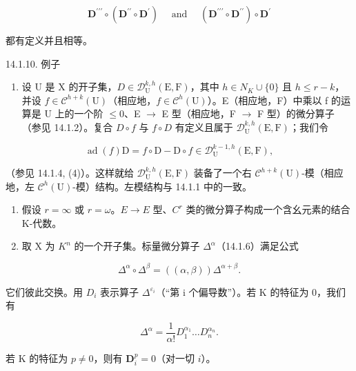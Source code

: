 \[
\mathbf {D} ^ {\prime \prime \prime} \circ (\mathbf {D} ^ {\prime \prime} \circ \mathbf {D} ^ {\prime}) \quad \text { and } \quad (\mathbf {D} ^ {\prime \prime \prime} \circ \mathbf {D} ^ {\prime \prime}) \circ \mathbf {D} ^ {\prime}
\]

都有定义并且相等。

14.1.10. 例子

\begin{enumerate}
\def\labelenumi{\alph{enumi})}
\tightlist
\item
  设 U 是 X 的开子集，\(D \in \mathcal{D}_{\mathrm{U}}^{k,h}(\mathrm{E}, \mathrm{F})\)，其中 \(h \in N_{K} \cup \{0\}\) 且 \(h \leqslant r-k\)，并设 \(f \in \mathcal{C}^{h+k}(\mathrm{U})\)（相应地，\(f \in \mathcal{C}^{h}(\mathrm{U})\)）。E（相应地，F）中乘以 f 的运算是 U 上的一个阶 \(\leqslant0\)、E \(\to\) E 型（相应地，F \(\to\) F 型）的微分算子（参见 14.1.2）。复合 \(D\circ f\) 与 \(f\circ D\) 有定义且属于 \(\mathcal{D}_{\mathrm{U}}^{k,h}(\mathrm{E},\mathrm{F})\)；我们令
\end{enumerate}

\[
\operatorname{ad} (f) \mathrm{D} = f \circ \mathrm{D} - \mathrm{D} \circ f \in \mathcal {D} _ {\mathrm{U}} ^ {k - 1, h} (\mathrm{E}, \mathrm{F}),
\]

（参见 14.1.4, (4)）。这样就给 \(\mathcal{D}_{\mathrm{U}}^{k,h}(\mathrm{E},\mathrm{F})\) 装备了一个右 \(\mathcal{C}^{h+k}(\mathrm{U})\)-模（相应地，左 \(\mathcal{C}^h (\mathrm{U})\)-模）结构。左模结构与 14.1.1 中的一致。

\begin{enumerate}
\def\labelenumi{\alph{enumi})}
\setcounter{enumi}{1}
\item
  假设 \(r = \infty\) 或 \(r = \omega\)。\(E \to E\) 型、\(C^r\) 类的微分算子构成一个含幺元素的结合 K-代数。
\item
  取 X 为 \(K^{n}\) 的一个开子集。标量微分算子 \(\Delta^{\alpha}\)（14.1.6）满足公式
\end{enumerate}

\[
\Delta^ {\alpha} \circ \Delta^ {\beta} = ((\alpha , \beta)) \Delta^ {\alpha + \beta}.
\]

它们彼此交换。用 \(D_{i}\) 表示算子 \(\Delta^{\varepsilon_{i}}\)（“第 i 个偏导数”）。若 K 的特征为 0，我们有

\[
\Delta^ {\alpha} = \frac {1}{\alpha !} D _ {1} ^ {\alpha_{1}} \dots D _ {n} ^ {\alpha_{n}}.
\]

若 K 的特征为 \(p \neq 0\)，则有 \(\mathbf{D}_{i}^{p} = 0\)（对一切 \(i\)）。

